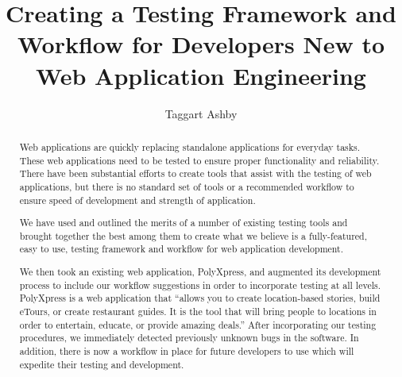 \documentclass[12pt]{ucthesis}
\begin{document}

\title{Creating a Testing Framework and Workflow for Developers New to Web Application Engineering} %
\author{Taggart Ashby}
  
 
     

\maketitle

\begin{frontmatter}

\copyrightpage

\committeemembershippage

\begin{abstract}
Web applications are quickly replacing standalone applications for everyday tasks. These web applications need to be tested to ensure proper functionality and reliability. There have been substantial efforts to create tools that assist with the testing of web applications, but there is no standard set of tools or a recommended workflow to ensure speed of development and strength of application.

We have used and outlined the merits of a number of existing testing tools and brought together the best among them to create what we believe is a fully-featured, easy to use, testing framework and workflow for web application development.

We then took an existing web application, PolyXpress, and augmented its development process to include our workflow suggestions in order to incorporate testing at all levels. PolyXpress is a web application that ``allows you to create location-based stories, build eTours, or create restaurant guides. It is the tool that will bring people to locations in order to entertain, educate, or provide amazing deals.''\cite{PX} After incorporating our testing procedures, we immediately detected previously unknown bugs in the software. In addition, there is now a workflow in place for future developers to use which will expedite their testing and development.
\end{abstract}

\tableofcontents

\end{frontmatter}
\end{document}
